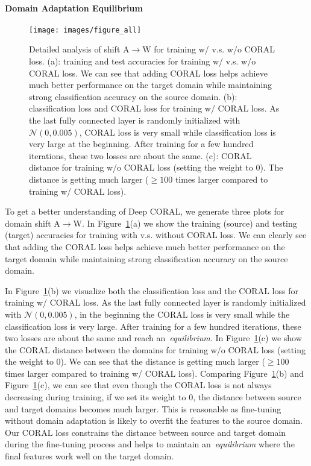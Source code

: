 \documentclass[graybox]{svmult}
\begin{document}
\paragraph{\textbf{Domain Adaptation Equilibrium}}

\begin{figure}[t]
\centering
\texttt{[image: images/figure\_all]}
\caption{Detailed analysis of shift A$\rightarrow$W for training w/ v.s. w/o CORAL loss. (a): training and test accuracies for training w/ v.s. w/o CORAL loss. We can see that adding CORAL loss helps achieve much better performance on the target domain while maintaining strong classification accuracy on the source domain. (b): classification loss and CORAL loss for training w/ CORAL loss. As the last fully connected layer is randomly initialized with $\mathcal{N}(0,0.005)$, CORAL loss is very small while classification loss is very large at the beginning. After training for a few hundred iterations, these two losses are about the same. (c): CORAL distance for training w/o CORAL loss  (setting the weight to 0). The distance is getting much larger ($\geqslant100$ times larger compared to training w/ CORAL loss).}
\label{fig:a_w}
\end{figure}

To get a better understanding of Deep CORAL, we generate three plots for domain shift A$\rightarrow$W. In Figure~\ref{fig:a_w}(a) we show the training (source) and testing (target) accuracies for training with v.s. without CORAL loss. We can clearly see that adding the CORAL loss helps achieve much better performance on the target domain while maintaining strong classification accuracy on the source domain. 

In Figure~\ref{fig:a_w}(b) we visualize both the classification loss and the CORAL loss for training w/ CORAL loss. As the last fully connected layer is randomly initialized with $\mathcal{N}(0,0.005)$,  in the beginning the CORAL loss is very small while the classification loss is very large. After training for a few hundred iterations, these two losses are about the same and reach an~\emph{equilibrium}. In Figure~\ref{fig:a_w}(c) we show the CORAL distance between the domains for training w/o CORAL loss (setting the weight to 0). We can see that the distance is getting much larger ($\geqslant100$ times larger compared to training w/ CORAL loss). Comparing Figure~\ref{fig:a_w}(b) and Figure~\ref{fig:a_w}(c), we can see that even though the CORAL loss is not always decreasing during training, if we set its weight to 0, the distance between source and target domains becomes much larger. This is reasonable as fine-tuning without domain adaptation is likely to overfit the features to the source domain. Our CORAL loss constrains the distance between source and target domain during the fine-tuning process and helps to maintain an~\emph{equilibrium} where the final features work well on the target domain.
\end{document}
